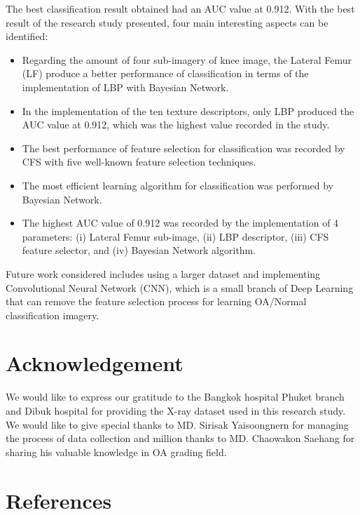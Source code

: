 \documentclass[review]{elsarticle}
\begin{document}
The best classification result obtained had an AUC value at 0.912. With the best result of the research study presented, four main interesting aspects can be identified:

\begin{itemize}
\item Regarding the amount of four sub-imagery of knee image, the Lateral Femur (LF) produce a better performance of classification in terms of the implementation of LBP with Bayesian Network.
\item In the implementation of the ten texture descriptors, only LBP produced the AUC value at 0.912, which was the highest value recorded in the study.
\item The best performance of feature selection for classification was recorded by CFS with five well-known feature selection techniques.
\item The most efficient learning algorithm for classification was performed by Bayesian Network.
\item The highest AUC value of 0.912 was recorded by the implementation of 4 parameters: (i) Lateral Femur sub-image, (ii) LBP descriptor, (iii) CFS feature selector, and (iv) Bayesian Network algorithm.
\end{itemize}

Future work considered includes using a larger dataset and implementing Convolutional Neural Network (CNN), which is a small branch of Deep Learning that can remove the feature selection process for learning OA/Normal classification imagery.

\section{Acknowledgement}

We would like to express our gratitude to the Bangkok hospital Phuket branch and Dibuk hospital for providing the X-ray dataset used in this research study. We would like to give special thanks to MD. Sirisak Yaisoongnern for managing the process of data collection and million thanks to MD. Chaowakon Saehang for sharing his valuable knowledge in OA grading field.

\section*{References}


\end{document}
